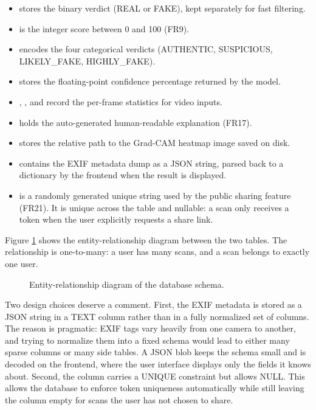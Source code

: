 \begin{itemize}
\item {} stores the binary verdict (REAL or FAKE), kept separately for fast filtering.
\item {} is the integer score between 0 and 100 (FR9).
\item {} encodes the four categorical verdicts (AUTHENTIC, SUSPICIOUS, LIKELY\_FAKE, HIGHLY\_FAKE).
\item {} stores the floating-point confidence percentage returned by the model.
\item {}, , and  record the per-frame statistics for video inputs.
\item {} holds the auto-generated human-readable explanation (FR17).
\item {} stores the relative path to the Grad-CAM heatmap image saved on disk.
\item {} contains the EXIF metadata dump as a JSON string, parsed back to a dictionary by the frontend when the result is displayed.
\item {} is a randomly generated unique string used by the public sharing feature (FR21). It is unique across the table and nullable: a scan only receives a token when the user explicitly requests a share link.
\end{itemize}

Figure \ref{fig:erd} shows the entity-relationship diagram between the two tables. The relationship is one-to-many: a user has many scans, and a scan belongs to exactly one user.

\begin{figure}[H]
\centering
{}
\caption{Entity-relationship diagram of the database schema.}
\label{fig:erd}
\end{figure}

Two design choices deserve a comment. First, the EXIF metadata is stored as a JSON string in a TEXT column rather than in a fully normalized set of columns. The reason is pragmatic: EXIF tags vary heavily from one camera to another, and trying to normalize them into a fixed schema would lead to either many sparse columns or many side tables. A JSON blob keeps the schema small and is decoded on the frontend, where the user interface displays only the fields it knows about. Second, the  column carries a UNIQUE constraint but allows NULL. This allows the database to enforce token uniqueness automatically while still leaving the column empty for scans the user has not chosen to share.

